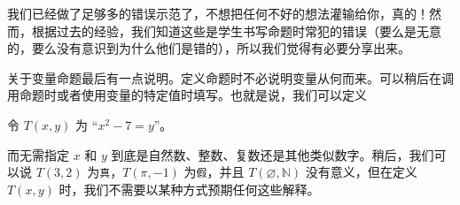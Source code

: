 我们已经做了足够多的错误示范了，不想把任何不好的想法灌输给你，真的！然而，根据过去的经验，我们知道这些是学生书写命题时常犯的错误（要么是无意的，要么没有意识到为什么他们是错的），所以我们觉得有必要分享出来。

关于变量命题最后有一点说明。定义命题时不必说明变量从何而来。可以稍后在调用命题时或者使用变量的特定值时填写。也就是说，我们可以定义
\begin{center}
    令 $T(x, y)$ 为 ``$x^2 - 7 = y$''。
\end{center}
而无需指定 $x$ 和 $y$ 到底是自然数、整数、复数还是其他类似数字。稍后，我们可以说 $T(3, 2)$ 为\verb|真|，$T(\pi, -1)$ 为\verb|假|，并且 $T(\varnothing, \mathbb{N})$ 没有意义，但在定义 $T(x, y)$ 时，我们不需要以某种方式预期任何这些解释。
